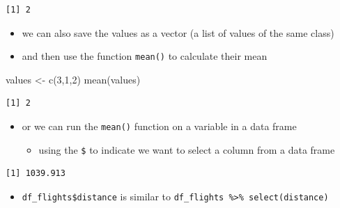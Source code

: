 \documentclass[
  letterpaper,
  DIV=11]{scrartcl}
\newenvironment{Shaded}{\begin{snugshade}}{\end{snugshade}}
\newcommand{\DecValTok}[1]{\textcolor[rgb]{0.68,0.00,0.00}{#1}}
\newcommand{\FunctionTok}[1]{\textcolor[rgb]{0.28,0.35,0.67}{#1}}
\newcommand{\NormalTok}[1]{\textcolor[rgb]{0.00,0.23,0.31}{#1}}
\newcommand{\OtherTok}[1]{\textcolor[rgb]{0.00,0.23,0.31}{#1}}
\newcommand{\SpecialCharTok}[1]{\textcolor[rgb]{0.37,0.37,0.37}{#1}}
\providecommand{\tightlist}{%
  \setlength{\itemsep}{0pt}\setlength{\parskip}{0pt}}\usepackage{longtable,booktabs,array}
\begin{document}
\begin{verbatim}
[1] 2
\end{verbatim}

\begin{itemize}
\tightlist
\item
  we can also save the values as a vector (a list of values of the same
  class)
\item
  and then use the function \texttt{mean()} to calculate their mean
\end{itemize}

\begin{Shaded}
\begin{Highlighting}[]
\NormalTok{values }\OtherTok{\textless{}{-}} \FunctionTok{c}\NormalTok{(}\DecValTok{3}\NormalTok{,}\DecValTok{1}\NormalTok{,}\DecValTok{2}\NormalTok{)}
\FunctionTok{mean}\NormalTok{(values)}
\end{Highlighting}
\end{Shaded}

\begin{verbatim}
[1] 2
\end{verbatim}

\begin{itemize}
\tightlist
\item
  or we can run the \texttt{mean()} function on a variable in a data
  frame

  \begin{itemize}
  \tightlist
  \item
    using the \texttt{\$} to indicate we want to select a column from a
    data frame
  \end{itemize}
\end{itemize}

\begin{Shaded}
\end{Shaded}

\begin{verbatim}
[1] 1039.913
\end{verbatim}

\begin{itemize}
\tightlist
\item
  \texttt{df\_flights\$distance} is similar to
  \texttt{df\_flights\ \%\textgreater{}\%\ select(distance)}
\end{itemize}
\end{document}
